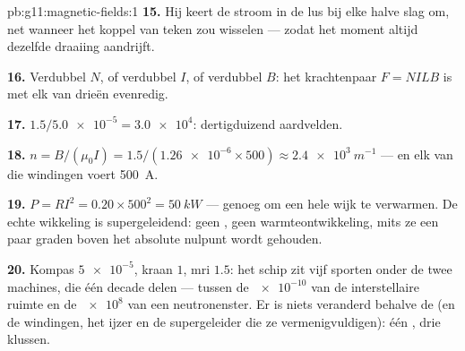 \begin{solution}{pb:g11:magnetic-fields:1}
\textbf{15.} Hij keert de stroom in de lus bij elke halve slag om, net
wanneer het koppel van teken zou wisselen --- zodat het moment altijd
dezelfde draaiing aandrijft.

\textbf{16.} Verdubbel $N$, of verdubbel $I$, of verdubbel $B$: het
krachtenpaar $F = NILB$ is met elk van drieën evenredig.

\textbf{17.} $1.5 / \num{5.0e-5} = \num{3.0e4}$: dertigduizend
aardvelden.

\textbf{18.} $n = B/(\mu_0 I) = 1.5 / (\num{1.26e-6} \times 500)
\approx \qty{2.4e3}{m^{-1}}$ --- en elk van die windingen voert
\qty{500}{A}.

\textbf{19.} $P = RI^2 = 0.20 \times 500^2 = \qty{50}{kW}$ --- genoeg om
een hele wijk te verwarmen. De echte wikkeling is supergeleidend: geen
, geen warmteontwikkeling, mits ze een paar graden boven het
absolute nulpunt wordt gehouden.

\textbf{20.} Kompas $\num{5e-5}$, kraan $1$, mri $1.5$: het schip zit
vijf sporten onder de twee machines, die één decade delen --- tussen de
$\num{e-10}$ van de interstellaire ruimte en de $\num{e8}$ van een
neutronenster. Er is niets veranderd behalve de  (en de windingen,
het ijzer en de supergeleider die ze vermenigvuldigen): één , drie
klussen.
\end{solution}
